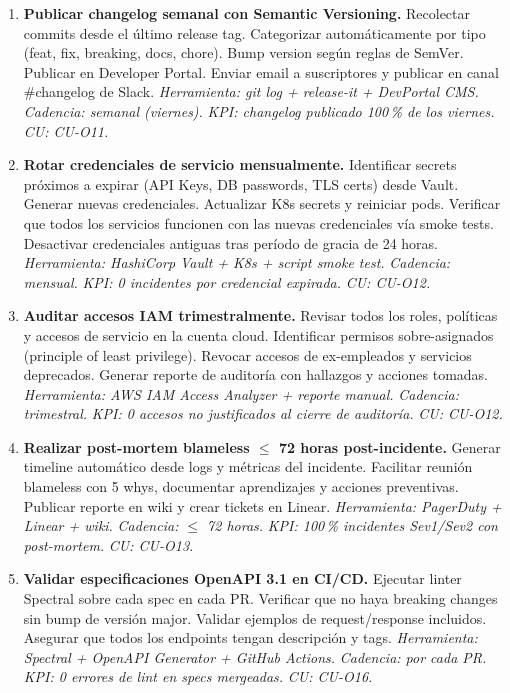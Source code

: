 ﻿\documentclass[11pt, letterpaper]{article}
\begin{document}
\begin{enumerate}[leftmargin=1.5cm, label=\textbf{OP\arabic*}, itemsep=2pt, topsep=4pt]
    \item \textbf{Publicar changelog semanal con Semantic Versioning.} Recolectar commits desde el último release tag. Categorizar automáticamente por tipo (feat, fix, breaking, docs, chore). Bump version según reglas de SemVer. Publicar en Developer Portal. Enviar email a suscriptores y publicar en canal \#changelog de Slack. \textit{Herramienta: git log + release-it + DevPortal CMS.} \textit{Cadencia: semanal (viernes).} \textit{KPI: changelog publicado 100\,\% de los viernes.} \textit{CU: CU-O11.}



    \item \textbf{Rotar credenciales de servicio mensualmente.} Identificar secrets próximos a expirar (API Keys, DB passwords, TLS certs) desde Vault. Generar nuevas credenciales. Actualizar K8s secrets y reiniciar pods. Verificar que todos los servicios funcionen con las nuevas credenciales vía smoke tests. Desactivar credenciales antiguas tras período de gracia de 24 horas. \textit{Herramienta: HashiCorp Vault + K8s + script smoke test.} \textit{Cadencia: mensual.} \textit{KPI: 0 incidentes por credencial expirada.} \textit{CU: CU-O12.}



    \item \textbf{Auditar accesos IAM trimestralmente.} Revisar todos los roles, políticas y accesos de servicio en la cuenta cloud. Identificar permisos sobre-asignados (principle of least privilege). Revocar accesos de ex-empleados y servicios deprecados. Generar reporte de auditoría con hallazgos y acciones tomadas. \textit{Herramienta: AWS IAM Access Analyzer + reporte manual.} \textit{Cadencia: trimestral.} \textit{KPI: 0 accesos no justificados al cierre de auditoría.} \textit{CU: CU-O12.}



    \item \textbf{Realizar post-mortem blameless $\leq$ 72 horas post-incidente.} Generar timeline automático desde logs y métricas del incidente. Facilitar reunión blameless con 5 whys, documentar aprendizajes y acciones preventivas. Publicar reporte en wiki y crear tickets en Linear. \textit{Herramienta: PagerDuty + Linear + wiki.} \textit{Cadencia: $\leq$ 72 horas.} \textit{KPI: 100\,\% incidentes Sev1/Sev2 con post-mortem.} \textit{CU: CU-O13.}



    \item \textbf{Validar especificaciones OpenAPI 3.1 en CI/CD.} Ejecutar linter Spectral sobre cada spec en cada PR. Verificar que no haya breaking changes sin bump de versión major. Validar ejemplos de request/response incluidos. Asegurar que todos los endpoints tengan descripción y tags. \textit{Herramienta: Spectral + OpenAPI Generator + GitHub Actions.} \textit{Cadencia: por cada PR.} \textit{KPI: 0 errores de lint en specs mergeadas.} \textit{CU: CU-O16.}




\end{enumerate}
\end{document}
